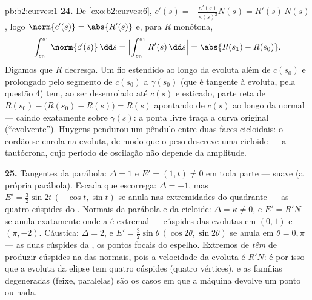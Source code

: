 \begin{solution}{pb:b2:curves:1}
\textbf{24.} De \cref{exo:b2:curves:6}, $c'(s) =
-\frac{\kappa'(s)}{\kappa(s)^2}N(s) = R'(s)\,N(s)$, logo
$\norm{c'(s)} = \abs{R'(s)}$ e, para $R$ monótona,
\[
\int_{s_0}^{s_1}\norm{c'(s)}\,\dd s =
\Bigl|\int_{s_0}^{s_1}R'(s)\,\dd s\Bigr| = \abs{R(s_1) -
R(s_0)} .
\]
Digamos que $R$ decresça. Um fio estendido ao longo da evoluta além de
$c(s_0)$ e prolongado pelo segmento de $c(s_0)$ a
$\gamma(s_0)$ (que é tangente à evoluta, pela questão 4)
tem, ao ser desenrolado até $c(s)$ e esticado, parte
reta de  $R(s_0) - \bigl(R(s_0) - R(s)\bigr) = R(s)$
apontando de $c(s)$ ao longo da normal --- caindo exatamente sobre
$\gamma(s)$: a ponta livre traça a curva original
(``evolvente''). Huygens pendurou um pêndulo entre duas faces
cicloidais: o cordão se enrola na evoluta, de modo que o peso descreve uma
cicloide --- a tautócrona, cujo período de oscilação não
depende da amplitude.

\textbf{25.} Tangentes da parábola: $\Delta = 1$ e $E' =
(1, t) \neq 0$ em toda parte ---  suave (a própria
parábola). Escada que escorrega: $\Delta = -1$, mas $E' =
\tfrac32\sin 2t\,(-\cos t, \sin t)$ se anula nas
extremidades do quadrante --- as quatro cúspides do . Normais da
parábola e da cicloide: $\Delta = \kappa \neq 0$, e
$E' = R'N$ se anula exatamente onde a  é extremal
--- cúspides das evolutas em $(0,1)$ e $(\pi, -2)$. Cáustica:
$\Delta = 2$, e $E' = \tfrac32\sin\theta\,(\cos2\theta,
\sin2\theta)$ se anula em $\theta = 0, \pi$ --- as duas cúspides
da , os pontos focais do espelho. Extremos de
 \emph{têm} de produzir cúspides na  das
normais, pois a velocidade da evoluta é $R'N$: é por isso que
a evoluta da elipse tem quatro cúspides (quatro vértices),
e as famílias degeneradas (feixe, paralelas) são os casos
em que a máquina devolve um ponto ou nada.
\end{solution}
